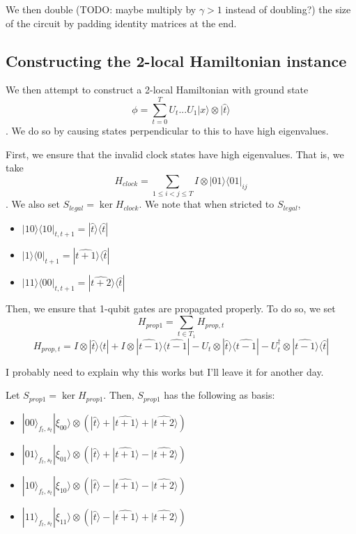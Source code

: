 \documentclass{article}
\theoremstyle{definition}
\begin{document}
We then double (TODO: maybe multiply by $\gamma>1$ instead of doubling?) the size of the circuit by padding identity matrices at the end.

\subsection{Constructing the 2-local Hamiltonian instance}

We then attempt to construct a 2-local Hamiltonian with ground state $$\phi=\sum_{t=0}^TU_t...U_1|x\rangle\otimes|\hat{t}\rangle$$. We do so by causing states perpendicular to this to have high eigenvalues.

First, we ensure that the invalid clock states have high eigenvalues. That is, we take $$H_{clock}=\sum_{1\leq i<j\leq T} I\otimes |01\rangle\langle01|_{ij}$$. We also set $S_{legal}=\ker H_{clock}$.
We note that when stricted to $S_{legal}$, 
\begin{itemize}
	\item $|10\rangle\langle10|_{t,t+1}
		=|\widehat{t}\rangle\langle\widehat{t}|$ 
	\item $|1\rangle\langle0|_{t+1}
		=|\widehat{t+1}\rangle\langle\widehat{t}|$
	\item $|11\rangle\langle00|_{t,t+1}
		=|\widehat{t+2}\rangle\langle\widehat{t}|$
\end{itemize}

Then, we ensure that 1-qubit gates are propagated properly. To do so, we set
	$$H_{prop1}=\sum_{t\in T_1}H_{prop,t}$$
	$$H_{prop,t}=I\otimes|\widehat{t}\rangle\langle\widehat{t}|
		+I\otimes|\widehat{t-1}\rangle\langle\widehat{t-1}|
		-U_t\otimes|\widehat{t}\rangle\langle\widehat{t-1}|
		-U_t^\dagger\otimes|\widehat{t-1}\rangle\langle\widehat{t}|$$

I probably need to explain why this works but I'll leave it for another day.

Let $S_{prop1}=\ker H_{prop1}$.
Then, $S_{prop1}$ has the following as basis:
\begin{itemize}
	\item $|00\rangle_{f_t,s_t}|\xi_{00}\rangle\otimes
		(|\widehat{t}\rangle+|\widehat{t+1}\rangle+|\widehat{t+2}\rangle)$
	\item $|01\rangle_{f_t,s_t}|\xi_{01}\rangle\otimes
		(|\widehat{t}\rangle+|\widehat{t+1}\rangle-|\widehat{t+2}\rangle)$
	\item $|10\rangle_{f_t,s_t}|\xi_{10}\rangle\otimes
		(|\widehat{t}\rangle-|\widehat{t+1}\rangle-|\widehat{t+2}\rangle)$
	\item $|11\rangle_{f_t,s_t}|\xi_{11}\rangle\otimes
		(|\widehat{t}\rangle-|\widehat{t+1}\rangle+|\widehat{t+2}\rangle)$
\end{itemize}
\end{document}
